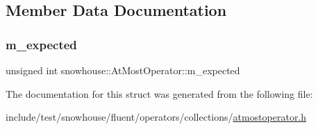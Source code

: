 \subsection{Member Data Documentation}
\mbox{\label{structsnowhouse_1_1AtMostOperator_a0b796ace1e23f4d0bc53918706b48c3e}} 
\subsubsection{\texorpdfstring{m\_expected}{m\_expected}}
{\footnotesize\ttfamily unsigned int snowhouse\+::\+At\+Most\+Operator\+::m\+\_\+expected}



The documentation for this struct was generated from the following file\+:\begin{DoxyCompactItemize}
\item 
include/test/snowhouse/fluent/operators/collections/\mbox{\hyperlink{atmostoperator_8h}{atmostoperator.\+h}}\end{DoxyCompactItemize}
